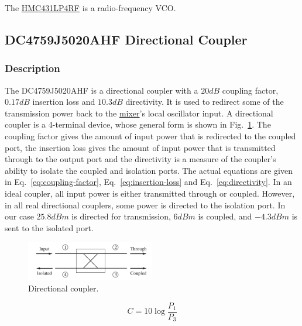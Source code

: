 The
\href{http://www.analog.com/media/en/technical_documentation/data_sheets/hmc431.pdf}{HMC431LP4RF} is
a radio-frequency VCO\@.

\subsection{DC4759J5020AHF Directional Coupler}
\label{sec:dc4759j5020ahf}

\subsubsection{Description}
\label{sec:dc4759j5020ahf-description}

The DC4759J5020AHF is a directional coupler with a $20 \si{dB}$ coupling factor, $0.17 \si{dB}$
insertion loss and $10.3 \si{dB}$ directivity. It is used to redirect some of the transmission power
back to the \hyperref[sec:adl5802]{mixer}'s local oscillator input. A directional coupler is a
4-terminal device, whose general form is shown in Fig.~\ref{fig:directional-coupler}. The coupling
factor gives the amount of input power that is redirected to the coupled port, the insertion loss
gives the amount of input power that is transmitted through to the output port and the directivity
is a measure of the coupler's ability to isolate the coupled and isolation ports. The actual
equations are given in Eq.~\ref{eq:coupling-factor}, Eq.~\ref{eq:insertion-loss} and
Eq.~\ref{eq:directivity}. In an ideal coupler, all input power is either transmitted through or
coupled. However, in all real directional couplers, some power is directed to the isolation port. In
our case $25.8 \si{dBm}$ is directed for transmission, $6 \si{dBm}$ is coupled, and $-4.3 \si{dBm}$
is sent to the isolated port.

\begin{figure}[h]
        \centering
        \includegraphics[width=0.5\textwidth]{data/directional-coupler}
        \caption{Directional coupler.}
        \label{fig:directional-coupler}
\end{figure}

\begin{equation}
        \label{eq:coupling-factor}
        C = 10 \log \frac{P_1}{P_3}
\end{equation}

